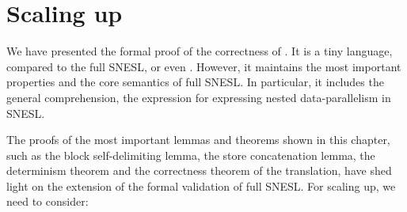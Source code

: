 \section{Scaling up}

We have presented the formal proof of the correctness of \fmsnesl. 
It is a tiny language, compared to the full SNESL, or even \mysnesl. 
However, it maintains the most important properties and the core semantics of full SNESL.
In particular, it includes the general comprehension, the expression for expressing nested data-parallelism in SNESL. 
 
The proofs of the most important lemmas and theorems shown in this chapter, such as the block self-delimiting lemma, the store concatenation lemma, the determinism theorem and the correctness theorem of the translation, have shed light on the extension of the formal validation of full SNESL. 
For scaling up, we need to consider:

